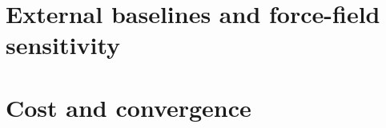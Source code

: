 \documentclass[%
 preprint,
 superscriptaddress,
 amsmath,amssymb,
 aps,
 prb,
 floatfix,
]{revtex4-2}
\begin{document}
\clearpage

\section{External baselines and force-field sensitivity}







\clearpage

\section{Cost and convergence}






\end{document}

